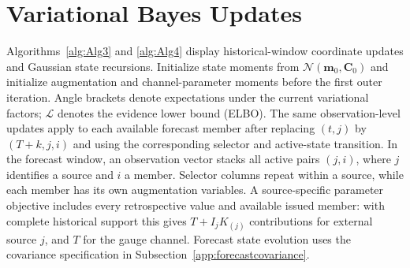 \documentclass[APA,STIX1COL]{WileyNJD-v2}
\begin{document}
\section{Variational Bayes Updates}

Algorithms~\ref{alg:Alg3} and \ref{alg:Alg4} display historical-window coordinate updates and Gaussian state recursions. Initialize state moments from $\mathcal N(\mathbf m_0,\mathbf C_0)$ and initialize augmentation and channel-parameter moments before the first outer iteration. Angle brackets denote expectations under the current variational factors; $\mathcal L$ denotes the evidence lower bound (ELBO). The same observation-level updates apply to each available forecast member after replacing $(t,j)$ by $(T+k,j,i)$ and using the corresponding selector and active-state transition. In the forecast window, an observation vector stacks all active pairs \((j,i)\), where \(j\) identifies a source and \(i\) a member. Selector columns repeat within a source, while each member has its own augmentation variables. A source-specific parameter objective includes every retrospective value and available issued member: with complete historical support this gives \(T+I_jK_{(j)}\) contributions for external source \(j\), and \(T\) for the gauge channel. Forecast state evolution uses the covariance specification in Subsection~\ref{app:forecastcovariance}.
\end{document}

